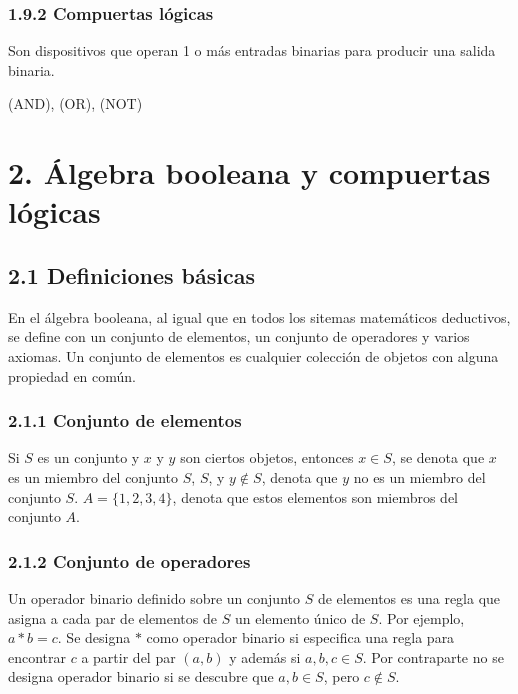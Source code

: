 \documentclass{article}
\begin{document}
\subsubsection*{1.9.2 Compuertas l\'{o}gicas}
Son dispositivos que operan 1 o m\'{a}s entradas binarias para producir una salida binaria.

\begin{center}
    (AND), (OR), (NOT)
\end{center}

\newpage
\section*{2. \'{A}lgebra booleana y compuertas l\'{o}gicas}
\paragraph*{}
\normalsize

\subsection*{2.1 Definiciones b\'{a}sicas}
En el \'{a}lgebra booleana, al igual que en todos los sitemas matem\'{a}ticos deductivos,
se define con un conjunto de elementos, un conjunto de operadores y varios axiomas.
Un conjunto de elementos es cualquier colecci\'{o}n de objetos con alguna propiedad en 
com\'{u}n. 

\subsubsection*{2.1.1 Conjunto de elementos}
Si $S$ es un conjunto y $x$ y $y$ son ciertos objetos, entonces $x \in S$, se denota que
$x$ es un miembro del conjunto $S$, $S$, y $y \notin S$, denota que $y$ no es un miembro
del conjunto $S$. $A = \{1, 2, 3, 4\}$, denota que estos elementos son miembros del conjunto
$A$. 

\subsubsection*{2.1.2 Conjunto de operadores}
Un operador binario definido sobre un conjunto $S$ de elementos es una regla que asigna a
cada par de elementos de $S$ un elemento \'{u}nico de $S$. Por ejemplo, $a * b = c$.
Se designa $*$ como operador binario si especifica una regla para encontrar $c$ a partir
del par $(a, b)$ y adem\'{a}s si $a, b, c \in S$. Por contraparte no se designa operador
binario si se descubre que $a, b \in S$, pero $c \notin S$.
\end{document}
